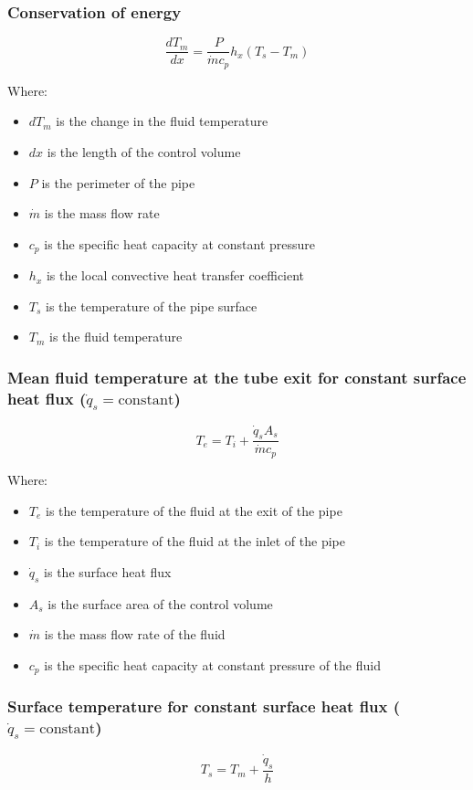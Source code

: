 \documentclass[11pt]{article}
\begin{document}
\subsubsection{Conservation of energy}
\label{sec:org9d5df3f}
\[\frac{dT_m}{dx} = \frac{P}{\dot{m} c_p} h_x (T_s - T_m)\]

Where:
\begin{itemize}
\item \(dT_m\) is the change in the fluid temperature
\item \(dx\) is the length of the control volume
\item \(P\) is the perimeter of the pipe
\item \(\dot{m}\) is the mass flow rate
\item \(c_p\) is the specific heat capacity at constant pressure
\item \(h_x\) is the local convective heat transfer coefficient
\item \(T_s\) is the temperature of the pipe surface
\item \(T_m\) is the fluid temperature
\end{itemize}

\subsubsection{Mean fluid temperature at the tube exit for constant surface heat flux (\(\dot{q}_s = \text{constant}\))}
\label{sec:orge9e83de}
\[T_e = T_i + \frac{\dot{q}_s A_s}{\dot{m} c_p}\]

Where:
\begin{itemize}
\item \(T_e\) is the temperature of the fluid at the exit of the pipe
\item \(T_i\) is the temperature of the fluid at the inlet of the pipe
\item \(\dot{q}_s\) is the surface heat flux
\item \(A_s\) is the surface area of the control volume
\item \(\dot{m}\) is the mass flow rate of the fluid
\item \(c_p\) is the specific heat capacity at constant pressure of the fluid
\end{itemize}

 \newpage

\subsubsection{Surface temperature for constant surface heat flux (\(\dot{q}_s = \text{constant}\))}
\label{sec:orgdc2e569}
\[T_s = T_m + \frac{\dot{q}_s}{h}\]
\end{document}
